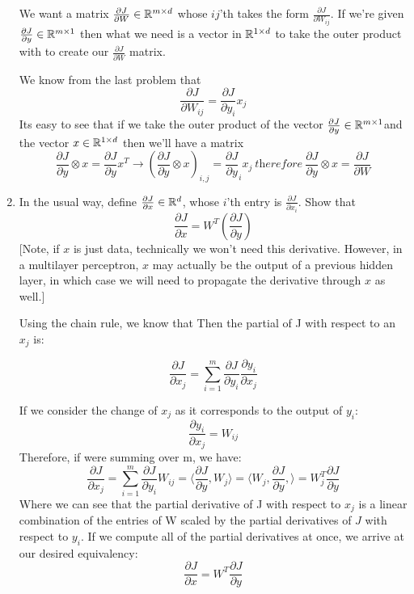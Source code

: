 \documentclass{article}
\theoremstyle{plain}
\theoremstyle{definition}
\begin{document}
\begin{enumerate}
\subitem

We want a matrix $\frac{\partial J}{\partial W}\in\mathbb{R}^{m\times d}$ whose $ij$'th takes the form $\frac{\partial J}{\partial W_{ij}}$. If we're given $\frac{\partial J}{\partial y}\in\mathbb{R}^{m\times1}$ then what we need is a vector in $\mathbb{R}^{1 \times d}$ to take the outer product with to create our $\frac{\partial J}{\partial W}$ matrix.

We know from the last problem that 
$$
\frac{\partial J}{\partial W_{ij}}=\frac{\partial J}{\partial y_{i}}x_{j}
$$
Its easy to see that if we take the outer product of the vector $\frac{\partial J}{\partial y} \in \mathbb{R}^{m \times 1}$and the vector $x \in \mathbb{R}^{1\times d}$ then we'll have a matrix 
$$
 \frac{\partial J}{\partial y} \otimes x = \frac{\partial J}{\partial y}x^T \rightarrow (\frac{\partial J}{\partial y}\otimes x)_{i,j} = \frac{\partial J}{\partial y}_i x_j \ \textit{therefore} \  \frac{\partial J}{\partial y} \otimes x =  \frac{\partial J}{\partial W} 
$$

\item In the usual way, define $\frac{\partial J}{\partial x}\in\mathbb{R}^{d}$,
whose $i$'th entry is $\frac{\partial J}{\partial x_{i}}$. Show
that 
\[
\frac{\partial J}{\partial x}=W^{T}\left(\frac{\partial J}{\partial y}\right)
\]
{[}Note, if $x$ is just data, technically we won't need this derivative.
However, in a multilayer perceptron, $x$ may actually be the output
of a previous hidden layer, in which case we will need to propagate
the derivative through $x$ as well.{]} \\

\subitem

Using the chain rule, we know that Then the partial of J with respect to an $x_j$ is: 

$$\frac{\partial J}{\partial x_j} = \sum_{i=1}^m \frac{\partial J}{\partial y_i} \frac{\partial y_i}{\partial x_j}$$ 

If we consider the change of $x_j$ as it corresponds to the output of $y_i$:
$$
    \frac{\partial y_i}{\partial x_j} = W_{ij}
$$
Therefore, if were summing over m, we have:
$$
    \frac{\partial J}{\partial x_j} = \sum_{i=1}^m \frac{\partial J}{\partial y_i} W_{ij} = \langle \frac{\partial J}{\partial y}, W_j \rangle = \langle W_j, \frac{\partial J}{\partial y},\rangle = W_j^T \frac{\partial J}{\partial y}
$$
Where we can see that the partial derivative of J with respect to $x_j$ is a linear combination of the entries of W scaled by the partial derivatives of $J$ with respect to $y_i$. If we compute all of the partial derivatives at once, we arrive at our desired equivalency:
$$
    \frac{\partial J}{\partial x} = W^T \frac{\partial J}{\partial y}
$$




\end{enumerate}
\end{document}
